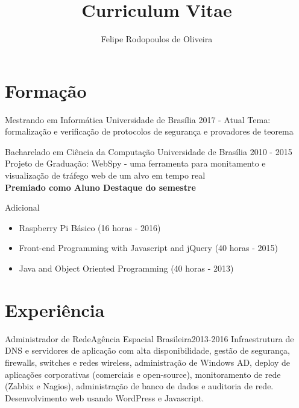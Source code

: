 \documentclass{cv}
\title{Curriculum Vitae}
\author{Felipe Rodopoulos de Oliveira}
\begin{document}
  \maketitle
  \vspace{-.75cm}
  \section{Formação}
  \begin{chronoitem}
    {Mestrando em Informática} {Universidade de Brasília} {2017 - Atual}
    Tema: formalização e verificação de protocolos de segurança e provadores de teorema
  \end{chronoitem}

  \begin{chronoitem}
    {Bacharelado em Ciência da Computação} {Universidade de Brasília} {2010 - 2015}
    Projeto de Graduação: WebSpy - uma ferramenta para monitamento e visualização de tráfego web de um alvo em tempo real \\
    \textbf{Premiado como Aluno Destaque do semestre}
  \end{chronoitem}

  \begin{chronoitem}
    {Adicional}{}{}
    \begin{itemize}\setlength\itemsep{.5em}
      \item[] Raspberry Pi Básico \hfill (16 horas - 2016)
      \item[] Front-end Programming with Javascript and jQuery \hfill (40 horas - 2015)
      \item[] Java and Object Oriented Programming \hfill (40 horas - 2013)
    \end{itemize}
  \end{chronoitem}
  \vspace{-.5cm}

  \section{Experiência}
  \begin{chronoitem}
    {Administrador de Rede}{Agência Espacial Brasileira}{2013-2016}
    Infraestrutura de DNS e servidores de aplicação com alta disponibilidade, gestão de segurança, firewalls, switches e redes wireless, administração de Windows AD, deploy de aplicações corporativas (comerciais e open-source), monitoramento de rede (Zabbix e Nagios), administração de banco de dados e auditoria de rede. Desenvolvimento web usando WordPress e Javascript.
  \end{chronoitem}
\end{document}
